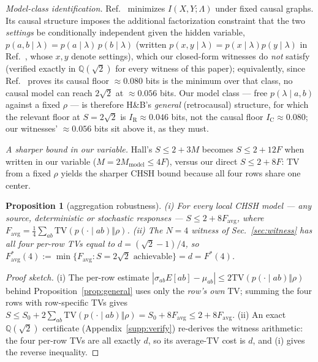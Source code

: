 \documentclass[aps,pra,reprint,superscriptaddress,floatfix]{revtex4-2}
\newcommand{\TV}{\mathrm{TV}}
\newtheorem{proposition}{Proposition}
\begin{document}
\emph{Model-class identification.} Ref.~
minimizes $I(X,Y;\Lambda)$ under fixed causal graphs. Its causal structure
imposes the additional factorization constraint that the two
\emph{settings} be conditionally independent given the hidden variable,
$p(a,b\mid\lambda)=p(a\mid\lambda)\,p(b\mid\lambda)$ (written
$p(x,y\mid\lambda)=p(x\mid\lambda)p(y\mid\lambda)$ in
Ref.~, whose $x,y$ denote settings), which our
closed-form witnesses do \emph{not} satisfy (verified exactly in
$\mathbb{Q}(\sqrt2)$ for every witness of this paper); equivalently, since
Ref.~ proves its causal floor
$\approx0.080$ bits is the minimum over that class, no causal model can
reach $2\sqrt2$ at $\approx0.056$ bits. Our model class --- free
$p(\lambda\mid a,b)$ against a fixed $\rho$ --- is therefore H\&B's
\emph{general} (retrocausal) structure, for which the relevant floor at
$S=2\sqrt2$ is $I_{\mathrm{R}}\approx0.046$ bits, not the causal floor
$I_{\mathrm{C}}\approx0.080$; our witnesses' $\approx0.056$ bits sit above
it, as they must.

\emph{A sharper bound in our variable.} Hall's $S\le2+3M$ becomes
$S\le2+12F$ when written in our variable ($M=2M_{\mathrm{model}}\le4F$),
versus our direct $S\le2+8F$: TV from a fixed $\rho$ yields the sharper
CHSH bound because all four rows share one center.

\begin{proposition}[aggregation robustness]
\label{prop:avg}
(i) For every local CHSH model --- any source, deterministic or
stochastic responses --- $S\le2+8F_{\mathrm{avg}}$, where
$F_{\mathrm{avg}}=\tfrac14\sum_{ab}\TV(p(\cdot\mid ab)\Vert\rho)$.
(ii) The $N=4$ witness of Sec.~\ref{sec:witness} has all four per-row TVs
equal to $d=(\sqrt2-1)/4$, so
$F^*_{\mathrm{avg}}(4):=\min\{F_{\mathrm{avg}}:S=2\sqrt2\text{ achievable}\}
=d=F^*(4)$.
\end{proposition}

\begin{proof}[Proof sketch]
(i) The per-row estimate
$|\sigma_{ab}E[ab]-\mu_{ab}|\le2\TV(p(\cdot\mid ab)\Vert\rho)$ behind
Proposition~\ref{prop:general} uses only the \emph{row's own} TV; summing
the four rows with row-specific TVs gives
$S\le S_0+2\sum_{ab}\TV(p(\cdot\mid ab)\Vert\rho)=S_0+8F_{\mathrm{avg}}
\le2+8F_{\mathrm{avg}}$. (ii) An exact $\mathbb{Q}(\sqrt2)$ certificate
(Appendix~\ref{supp:verify}) re-derives the witness arithmetic: the four
per-row TVs are all exactly $d$, so its average-TV cost is $d$, and (i)
gives the reverse inequality.
\end{proof}
\end{document}
